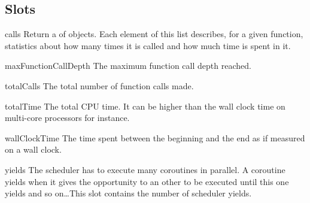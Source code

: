 \subsection{Slots}

\begin{urbiscriptapi}

\item[calls]%
  Return a  of  objects. Each
  element of this list describes, for a given function, statistics about how
  many times it is called and how much time is spent in it.

\item[maxFunctionCallDepth]%
  The maximum function call depth reached.

\item[totalCalls]%
  The total number of function calls made.

\item[totalTime]%
  The total CPU time. It can be higher than the wall clock time on
  multi-core processors for instance.

\item[wallClockTime]%
  The time spent between the beginning and the end as if measured on a wall
  clock.

\item[yields]%
  The scheduler has to execute many coroutines in parallel. A coroutine
  yields when it gives the opportunity to an other to be executed until this
  one yields and so on\dots This slot contains the number of scheduler
  yields.

\end{urbiscriptapi}


